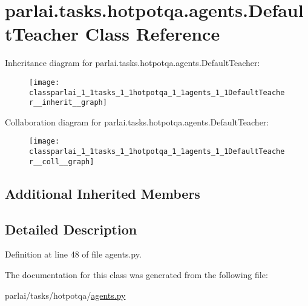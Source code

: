 \hypertarget{classparlai_1_1tasks_1_1hotpotqa_1_1agents_1_1DefaultTeacher}{}\section{parlai.\+tasks.\+hotpotqa.\+agents.\+Default\+Teacher Class Reference}
\label{classparlai_1_1tasks_1_1hotpotqa_1_1agents_1_1DefaultTeacher}


Inheritance diagram for parlai.\+tasks.\+hotpotqa.\+agents.\+Default\+Teacher\+:
\nopagebreak
\begin{figure}[H]
\begin{center}
\leavevmode
\texttt{[image: classparlai\_1\_1tasks\_1\_1hotpotqa\_1\_1agents\_1\_1DefaultTeacher\_\_inherit\_\_graph]}
\end{center}
\end{figure}


Collaboration diagram for parlai.\+tasks.\+hotpotqa.\+agents.\+Default\+Teacher\+:
\nopagebreak
\begin{figure}[H]
\begin{center}
\leavevmode
\texttt{[image: classparlai\_1\_1tasks\_1\_1hotpotqa\_1\_1agents\_1\_1DefaultTeacher\_\_coll\_\_graph]}
\end{center}
\end{figure}
\subsection*{Additional Inherited Members}


\subsection{Detailed Description}


Definition at line 48 of file agents.\+py.



The documentation for this class was generated from the following file\+:\begin{DoxyCompactItemize}
\item 
parlai/tasks/hotpotqa/\hyperlink{parlai_2tasks_2hotpotqa_2agents_8py}{agents.\+py}\end{DoxyCompactItemize}
